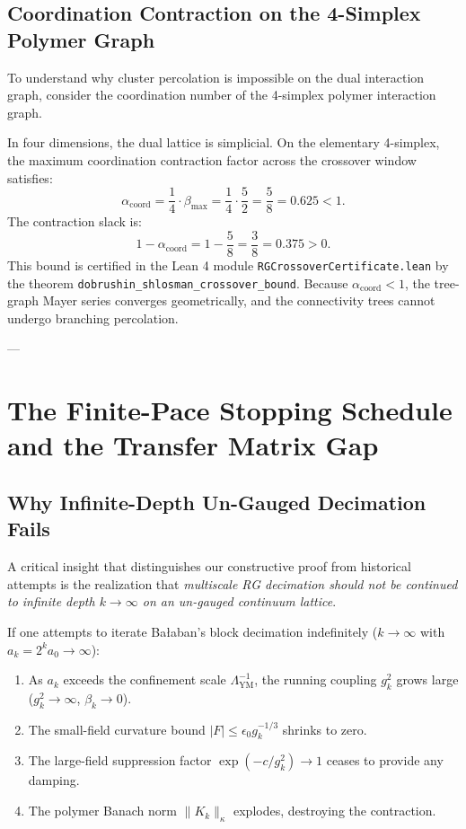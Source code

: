 \subsection{Coordination Contraction on the 4-Simplex Polymer Graph}
\label{subsec:coordination_contraction}

To understand why cluster percolation is impossible on the dual interaction graph, consider the coordination number of the 4-simplex polymer interaction graph.

In four dimensions, the dual lattice is simplicial. On the elementary 4-simplex, the maximum coordination contraction factor across the crossover window satisfies:
\begin{equation}
\label{eq:ch13_coordination_contraction}
\alpha_{\mathrm{coord}} = \frac{1}{4} \cdot \beta_{\max} = \frac{1}{4} \cdot \frac{5}{2} = \frac{5}{8} = 0.625 < 1.
\end{equation}
The contraction slack is:
\begin{equation}
1 - \alpha_{\mathrm{coord}} = 1 - \frac{5}{8} = \frac{3}{8} = 0.375 > 0.
\end{equation}
This bound is certified in the Lean 4 module \texttt{RGCrossoverCertificate.lean} by the theorem \texttt{dobrushin\_shlosman\_crossover\_bound}. Because $\alpha_{\mathrm{coord}} < 1$, the tree-graph Mayer series converges geometrically, and the connectivity trees cannot undergo branching percolation.

---

\section{The Finite-Pace Stopping Schedule and the Transfer Matrix Gap}
\label{sec:stopping_schedule_and_gap}

\subsection{Why Infinite-Depth Un-Gauged Decimation Fails}
\label{subsec:why_infinite_decimation_fails}

A critical insight that distinguishes our constructive proof from historical attempts is the realization that \emph{multiscale RG decimation should not be continued to infinite depth $k \to \infty$ on an un-gauged continuum lattice}.

If one attempts to iterate Ba\l aban's block decimation indefinitely ($k \to \infty$ with $a_k = 2^k a_0 \to \infty$):
\begin{enumerate}
    \item As $a_k$ exceeds the confinement scale $\Lambda_{\mathrm{YM}}^{-1}$, the running coupling $g_k^2$ grows large ($g_k^2 \to \infty$, $\beta_k \to 0$).
    \item The small-field curvature bound $|F| \le \epsilon_0 g_k^{-1/3}$ shrinks to zero.
    \item The large-field suppression factor $\exp(-c / g_k^2) \to 1$ ceases to provide any damping.
    \item The polymer Banach norm $\|K_k\|_\kappa$ explodes, destroying the contraction.
\end{enumerate}

